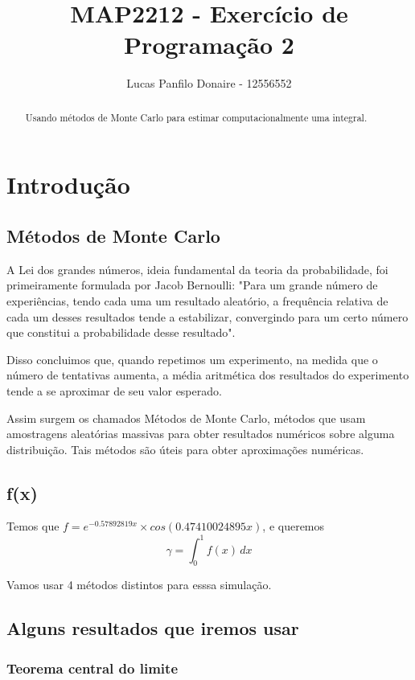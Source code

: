 \documentclass{article}
\title{MAP2212 - Exercício de Programação 2}
\author{Lucas Panfilo Donaire - 12556552}
\begin{document}
\maketitle

\newcommand{\PR}[1]{\ensuremath{\left[#1\right]}}
\newcommand{\PC}[1]{\ensuremath{\left(#1\right)}}
\newcommand{\chav}[1]{\ensuremath{\left\{#1\right\}}}

\begin{abstract}
Usando métodos de Monte Carlo para estimar computacionalmente uma integral.
\end{abstract}

\section{Introdução}
\subsection{Métodos de Monte Carlo}

A Lei dos grandes números, ideia fundamental da teoria da probabilidade, foi primeiramente formulada por Jacob Bernoulli: "Para um grande número de experiências, tendo cada uma um resultado aleatório, a frequência relativa de cada um desses resultados tende a estabilizar, convergindo para um certo número que constitui a probabilidade desse resultado".

Disso concluimos que, quando repetimos um experimento, na medida que o número de tentativas aumenta, a média aritmética dos resultados do experimento tende a se aproximar de seu valor esperado. 

Assim surgem os chamados Métodos de Monte Carlo, métodos que usam amostragens aleatórias massivas para obter resultados numéricos sobre alguma distribuição. Tais métodos são úteis para obter aproximações numéricas.

\subsection{f(x)}
Temos que $f = e^{-0.57892819x}\times cos(0.47410024895x)$, e queremos 
\[ 
\gamma = \int_{0}^{1} f(x) \,dx 
\]

Vamos usar 4 métodos distintos para esssa simulação.
\subsection{Alguns resultados que iremos usar}

\subsubsection{Teorema central do limite}
\end{document}
